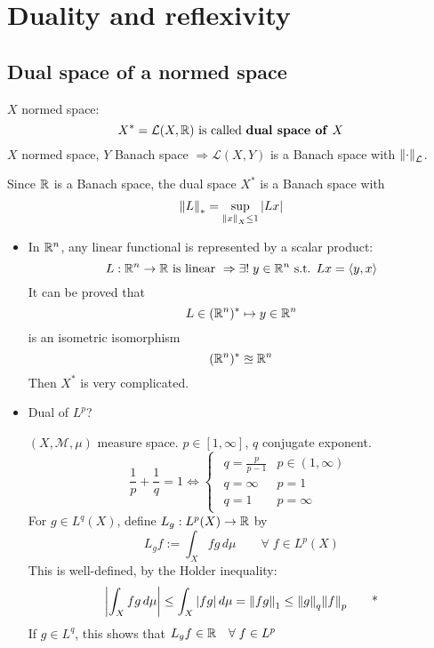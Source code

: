 \newpage
\section{Duality and reflexivity}
\subsection{Dual space of a normed space}
\(X\) normed space: 
\[
    X^* = \mathcal{L}(X, \mathbb{R}) \mbox{ is called \textbf{dual space of} }X
\]
\(X\) normed space, \(Y\) Banach space \(\Rightarrow \mathcal{L}(X, Y)\) is a Banach space with \(\norm{\cdot}_{\mathcal{L}}\).

Since \(\mathbb{R}\) is a Banach space, the dual space \(X^*\) is a Banach space with 
\[
    \norm{L}_* = \sup_{\norm{x}_X \leq 1} \abs{Lx}
\]
\begin{example}
    \begin{itemize}
        \item In \(\mathbb{R}^n\), any linear functional is represented by a scalar product:
            \[
                L : \mathbb{R}^n \to \mathbb{R} \mbox{ is linear } \Rightarrow \exists ! \; y \in \mathbb{R}^n \mbox{ s.t. } Lx = \langle y,x \rangle
            \]
            It can be proved that 
            \[
                L \in (\mathbb{R}^n)^* \mapsto y \in \mathbb{R}^n
            \]
            is an isometric isomorphism 
            \[
                (\mathbb{R}^n)^* \approxeq \mathbb{R}^n
            \]
            Then \(X^*\) is very complicated.
        \item Dual of \(L^p\)?
        
        \(\left(X, \mathcal{M}, \mu\right)\) measure space. \(p \in \left[1, \infty\right]\), \({q}\) conjugate exponent.
        \[
            \frac{1}{p} + \frac{1}{{q}} = 1 \Leftrightarrow 
            \begin{cases}
                \begin{array}{ll}
                    {q} = \frac{p}{p-1} & p \in (1, \infty) \\
                    {q} = \infty & p = 1 \\
                    {q}=1 & p = \infty
                \end{array}     
            \end{cases}
        \]
        For \(g \in L^{{q}}(X)\), define \(L_g : L^p(X) \to \mathbb{R}\) by
        \[
            L_g f := \int_X fg \, d\mu \qquad \forall \; f \in L^p(X)
        \]
        This is well-defined, by the Holder inequality:
        \[
            \abs{\int_X fg \, d\mu } \leq \int_X \abs{fg} \, d\mu = \norm{fg}_1 \leq \norm{g}_{{q}} \norm{f}_p \tag*{*} 
        \]
        If \(g \in L^{{q}}\), this shows that \(L_g f \in \mathbb{R} \quad \forall \; f \in L^p\)
    \end{itemize}
    
\end{example}
